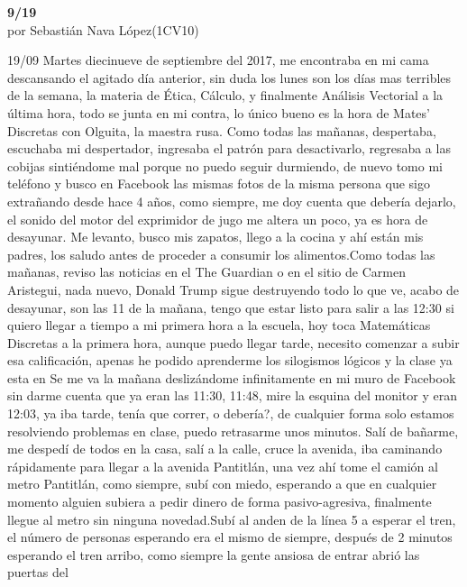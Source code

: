 \documentclass[letterpaper]{article}
\newcommand{\titlehomework}[4]{\begin{center}\section*{#4}{\large #2}\\#1\\#3\\[2ex]\end{center}}
\begin{document}
\begin{center}
\textbf{\Large{9/19}}\\[2ex]
\large{por Sebastián Nava López\footnotesize{(1CV10)}}
\end{center}
19/09
Martes diecinueve de septiembre del 2017, me encontraba en mi cama descansando el agitado día
anterior, sin duda los lunes son los días mas terribles de la semana, la materia de Ética, Cálculo,
y finalmente Análisis Vectorial a la última hora, todo se junta en mi contra, lo único bueno es la
hora de Mates' Discretas con Olguita, la maestra rusa. Como todas las mañanas, despertaba, escuchaba
mi despertador, ingresaba el patrón para desactivarlo, regresaba a las cobijas sintiéndome mal
porque no puedo seguir durmiendo, de nuevo tomo mi teléfono y busco en Facebook las mismas fotos de
la misma persona que sigo extrañando desde hace 4 años, como siempre, me doy cuenta que debería
dejarlo, el sonido del motor del exprimidor de jugo me altera un poco, ya es hora de desayunar. Me
levanto, busco mis zapatos, llego a la cocina y ahí están mis padres, los saludo antes de proceder a
consumir los alimentos.Como todas las mañanas, reviso las noticias en el The Guardian o en el sitio
de Carmen Aristegui, nada nuevo, Donald Trump sigue destruyendo todo lo que ve, %
acabo de desayunar, son las 11 de la mañana, tengo que estar listo para salir a las 12:30 si quiero
llegar a tiempo a mi primera hora a la escuela, hoy toca Matemáticas Discretas a la primera hora,
aunque puedo llegar tarde, necesito comenzar a subir esa calificación, apenas he podido aprenderme
los silogismos lógicos y la clase ya esta en %
Se me va la mañana deslizándome infinitamente en mi muro de Facebook sin darme cuenta que ya eran
las 11:30, 11:48, mire la esquina del monitor y eran 12:03, ya iba tarde, tenía que correr, o
debería?, de cualquier forma solo estamos resolviendo problemas en clase, puedo retrasarme unos
minutos. Salí de bañarme, me despedí de todos en la casa, salí a la calle, cruce la avenida, iba
caminando rápidamente para llegar a la avenida Pantitlán, una vez ahí tome el camión al metro
Pantitlán, como siempre, subí con miedo, esperando a que en cualquier momento alguien subiera a
pedir dinero de forma pasivo-agresiva, finalmente llegue al metro sin ninguna novedad.Subí al anden
de la línea 5 a esperar el tren, el número de personas esperando era el mismo de siempre, después de
2 minutos esperando el tren arribo, como siempre la gente ansiosa de entrar abrió las puertas del
\end{document}
